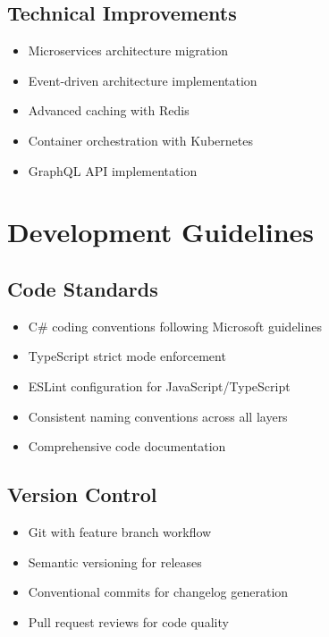 \documentclass[12pt,a4paper]{article}
\begin{document}
\subsection{Technical Improvements}

\begin{itemize}
    \item Microservices architecture migration
    \item Event-driven architecture implementation
    \item Advanced caching with Redis
    \item Container orchestration with Kubernetes
    \item GraphQL API implementation
\end{itemize}

\section{Development Guidelines}

\subsection{Code Standards}

\begin{itemize}
    \item C\# coding conventions following Microsoft guidelines
    \item TypeScript strict mode enforcement
    \item ESLint configuration for JavaScript/TypeScript
    \item Consistent naming conventions across all layers
    \item Comprehensive code documentation
\end{itemize}

\subsection{Version Control}

\begin{itemize}
    \item Git with feature branch workflow
    \item Semantic versioning for releases
    \item Conventional commits for changelog generation
    \item Pull request reviews for code quality
\end{itemize}
\end{document}
